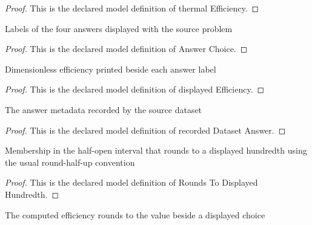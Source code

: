 \begin{proof}
  This is the declared model definition of thermal Efficiency.
\end{proof}
\begin{definition}
  \label{def:physics:phyx-mini-0422:phyxminiproblems-problemphyxmini0422-answerchoice}
  Labels of the four answers displayed with the source problem
\end{definition}
\begin{proof}
  This is the declared model definition of Answer Choice.
\end{proof}
\begin{definition}
  \label{def:physics:phyx-mini-0422:phyxminiproblems-problemphyxmini0422-displayedefficiency}
  Dimensionless efficiency printed beside each answer label
\end{definition}
\begin{proof}
  This is the declared model definition of displayed Efficiency.
\end{proof}
\begin{definition}
  \label{def:physics:phyx-mini-0422:phyxminiproblems-problemphyxmini0422-recordeddatasetanswer}
  The answer metadata recorded by the source dataset
\end{definition}
\begin{proof}
  This is the declared model definition of recorded Dataset Answer.
\end{proof}
\begin{definition}
  \label{def:physics:phyx-mini-0422:phyxminiproblems-problemphyxmini0422-roundstodisplayedhundredth}
  Membership in the half-open interval that rounds to a displayed hundredth using the usual round-half-up convention
\end{definition}
\begin{proof}
  This is the declared model definition of Rounds To Displayed Hundredth.
\end{proof}
\begin{definition}
  \label{def:physics:phyx-mini-0422:phyxminiproblems-problemphyxmini0422-isroundedefficiencyanswer}
  The computed efficiency rounds to the value beside a displayed choice
\end{definition}
